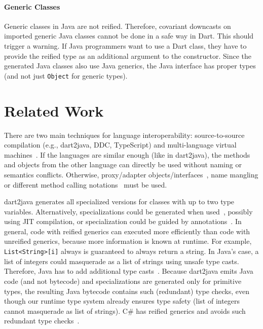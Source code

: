 \documentclass[sigplan]{acmart}
\begin{document}
\paragraph{Generic Classes}
Generic classes in Java are not reified. Therefore, covariant downcasts on imported generic Java classes cannot be done in a safe way in Dart. This should trigger a warning. If Java programmers want to use a Dart class, they have to provide the reified type as an additional argument to the constructor. Since the generated Java classes also use Java generics, the Java interface has proper types (and not just \texttt{Object} for generic types).


\section{Related Work}
There are two main techniques for language interoperability: source-to-source compilation (e.g., dart2java, DDC, TypeScript) and multi-language virtual machines~\cite{multivm_saarlang, vranythesis}. If the languages are similar enough (like in dart2java), the methods and objects from the other language can directly be used without naming or semantics conflicts. Otherwise, proxy/adapter objects/interfaces~\cite{DBLP:journals/jot/EkmanMS07}, name mangling or different method calling notations~\cite{DBLP:journals/corr/Springer16} must be used. 

dart2java generates all specialized versions for classes with up to two type variables. Alternatively, specializations could be generated when used~\cite{Kennedy:2001:DIG:378795.378797}, possibly using JIT compilation, or specialization could be guided by annotations~\cite{Dragos:2009:CGT:1565824.1565830}. In general, code with reified generics can executed more efficiently than code with unreified generics, because more information is known at runtime. For example, \texttt{List<String>[i]} always is guaranteed to always return a string. In Java's case, a list of integers could masquerade as a list of strings using unsafe type casts. Therefore, Java has to add additional type casts~\cite{Nino:2007:CEJ:1229688.1229690, BrachaJuly52004}. Because dart2java emits Java code (and not bytecode) and specializations are generated only for primitive types, the resulting Java bytecode contains such (redundant) type checks, even though our runtime type system already ensures type safety (list of integers cannot masquerade as list of strings). C\# has reified generics and avoids such redundant type checks~\cite{Kennedy:2001:DIG:378795.378797}.
\end{document}
